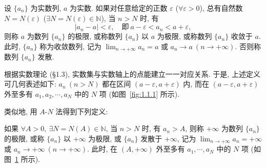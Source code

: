 \begin{definition}\label{def:1.1.1}
设 $\{a_{n}\}$ 为实数列, $a$ 为实数. 如果对任意给定的正数 $\varepsilon$ ($\forall\varepsilon>0$), 总有自然数 $N = N(\varepsilon)$ ($\exists N=N(\varepsilon)\in\mathbb{N}$), 当 $n>N$ 时, 有
\[
  |a_{n}-a|<\varepsilon,\quad \text{即}\ a-\varepsilon<a_{n}<a+\varepsilon,
\]
则称 $a$ 为数列 $\{a_n\}$ 的极限, 或称数列 $\{a_n\}$ 以 $a$ 为极限, 或称数列 $\{a_n\}$ 收敛于 $a$. 此时, $\{a_n\}$ 称为收敛数列, 记为 $\lim_{n\to+\infty} a_n = a$ 或 $a_n \to a\ (n \to +\infty)$. 否则称数列 $\{a_n\}$ 发散.
\end{definition}

根据实数理论 (\S1.3), 实数集与实数轴上的点能建立一一对应关系. 于是, 上述定义可几何表述如下: $a_{n}\ (n>N)$ 都在区间 $(a-\varepsilon, a+\varepsilon)$ 内, 而在 $(a-\varepsilon, a+\varepsilon)$ 外至多有 $a_{1}, a_{2}, \cdots, a_{N}$ 中的 $N$ 项 (如图~\ref{fig:1.1.1} 所示).

类似地, 用 $A\text{-}N$ 法得到下列定义:

如果 $\forall A>0,\ \exists N=N(A)\in\mathbb{N}$, 当 $n>N$ 时, 有 $a_{n}>A$, 则称 $+\infty$ 为数列 $\{a_{n}\}$ 的极限, 或称 $\{a_{n}\}$ 以 $+\infty$ 为极限, 或 $\{a_{n}\}$ 发散于 $+\infty$, 记为 $\lim_{n\to+\infty}a_{n}=+\infty$ 或 $a_{n}\to+\infty\ (n\to+\infty)$. 此时, 在 $(A,+\infty)$ 外至多有 $a_{1},\cdots,a_{N}$ 中的 $N$ 项 (如图~\ref{fig:1.1.2} 所示).

\begin{figure}[htbp]
\centering
\begin{minipage}[t]{0.48\textwidth}
\centering
{}
\caption{}\label{fig:1.1.1}
\end{minipage}
\hfill
\begin{minipage}[t]{0.48\textwidth}
\centering
{}
\caption{}\label{fig:1.1.2}
\end{minipage}
\end{figure}

